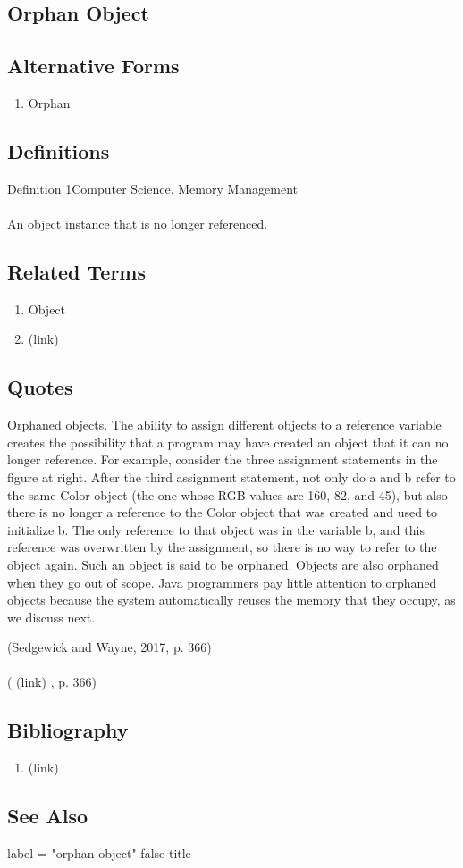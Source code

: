 \newpage \subsection*{Orphan Object } \subsection*{Alternative Forms } \begin{enumerate} \item  Orphan  \end{enumerate} \subsection*{Definitions } \begin{DIC_Def}{Definition 1Computer Science, Memory Management }{} \paragraph{} An object instance that is no longer referenced.  \end{DIC_Def} \subsection*{Related Terms } \begin{enumerate} \item  Object  \item  (link) \href{Orphan (Dictionary Entry) }{ }   \end{enumerate} \subsection*{Quotes } \begin{DIC_BlockQuote} Orphaned objects. The ability to assign different objects to a reference variable creates the possibility that a program may have created an object that it can no longer reference. For example, consider the three assignment statements in the ﬁgure at right. After the third assignment statement, not only do a and b refer to the same Color object (the one whose RGB values are 160, 82, and 45), but also there is no longer a reference to the Color object that was created and used to initialize b. The only reference to that object was in the variable b, and this reference was overwritten by the assignment, so there is no way to refer to the object again. Such an object is said to be orphaned. Objects are also orphaned when they go out of scope. Java programmers pay little attention to orphaned objects because the system automatically reuses the memory that they occupy, as we discuss next.  \end{DIC_BlockQuote} (Sedgewick and Wayne, 2017, p. 366)  \paragraph{} (  (link) \href{Sedgewick and Wayne, 2017 }{ } , p. 366)  \subsection*{Bibliography } \begin{enumerate} \item  (link) \href{Sedgewick and Wayne, 2017 }{ }   \end{enumerate} \subsection*{See Also } label = "orphan-object"  false  title  